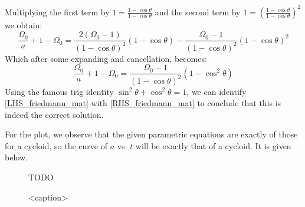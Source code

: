 Multiplying the first term by $1 = \frac{1 - \cos\theta}{1-\cos\theta}$ and the second term by $1 = \left(\frac{1 - \cos\theta}{1-\cos\theta}\right)^2$ we obtain:
\begin{equation}
    \frac{\Omega_0}{a} + 1 - \Omega_0 = \frac{2(\Omega_0 - 1)}{(1 -\cos\theta)^2}(1 - \cos\theta) - \frac{\Omega_0 - 1}{(1 - \cos\theta)^2}(1 - \cos\theta)^2
\end{equation}
Which after some expanding and cancellation, becomes:
\begin{equation}\label{RHS_friedmann_mat}
    \frac{\Omega_0}{a} + 1 - \Omega_0 = \frac{\Omega_0 - 1}{(1 - \cos\theta)^2}(1 -\cos^2\theta)
\end{equation}
Using the famous trig identity $\sin^2\theta + \cos^2\theta = 1$, we can identify \eqref{LHS_friedmann_mat} with \eqref{RHS_friedmann_mat} to conclude that this is indeed the correct solution.

For the plot, we observe that the given parametric equations are exactly of those for a cycloid, so the curve of $a$ vs. $t$ will be exactly that of a cycloid. It is given below.
\begin{figure}[htbp]
    \centering
    TODO
    \caption{<caption>}
    \label{plotatcycloid}
\end{figure}